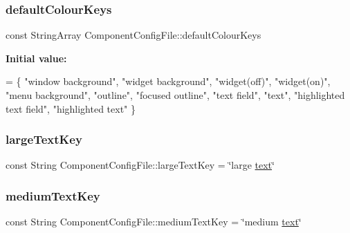 \subsubsection{\texorpdfstring{default\+Colour\+Keys}{defaultColourKeys}}
{\footnotesize\ttfamily const String\+Array Component\+Config\+File\+::default\+Colour\+Keys\hspace{0.3cm}{\ttfamily [static]}}

{\bfseries Initial value\+:}
\begin{DoxyCode}
= 
\{
    \textcolor{stringliteral}{"window background"},
    \textcolor{stringliteral}{"widget background"},
    \textcolor{stringliteral}{"widget(off)"},
    \textcolor{stringliteral}{"widget(on)"},
    \textcolor{stringliteral}{"menu background"},
    \textcolor{stringliteral}{"outline"},
    \textcolor{stringliteral}{"focused outline"},
    \textcolor{stringliteral}{"text field"},
    \textcolor{stringliteral}{"text"},
    \textcolor{stringliteral}{"highlighted text field"},
    \textcolor{stringliteral}{"highlighted text"}
\}
\end{DoxyCode}
\mbox{\label{classComponentConfigFile_ade34635c596844daae68c87a079ea5fd}} 
\subsubsection{\texorpdfstring{large\+Text\+Key}{largeTextKey}}
{\footnotesize\ttfamily const String Component\+Config\+File\+::large\+Text\+Key = \char`\"{}large \mbox{\hyperlink{classComponentConfigFile_a9bf86058d7f64d6ba94770c3dbf3cad8ac27156a5310c2ff67c46cd3cd629eb70}{text}}\char`\"{}\hspace{0.3cm}{\ttfamily [static]}}

\mbox{\label{classComponentConfigFile_a1f62cbbdd6827681a7e429185b0c56a1}} 
\subsubsection{\texorpdfstring{medium\+Text\+Key}{mediumTextKey}}
{\footnotesize\ttfamily const String Component\+Config\+File\+::medium\+Text\+Key = \char`\"{}medium \mbox{\hyperlink{classComponentConfigFile_a9bf86058d7f64d6ba94770c3dbf3cad8ac27156a5310c2ff67c46cd3cd629eb70}{text}}\char`\"{}\hspace{0.3cm}{\ttfamily [static]}}


